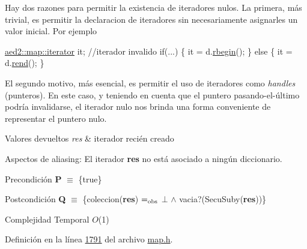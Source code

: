 Hay dos razones para permitir la existencia de iteradores nulos. La primera, más trivial, es permitir la declaracion de iteradores sin necesariamente asignarles un valor inicial. Por ejemplo 
\begin{DoxyCode}
\hyperlink{classaed2_1_1map_1_1iterator}{aed2::map::iterator} it;   \textcolor{comment}{//iterador invalido}
\textcolor{keywordflow}{if}(...) \{
  it = d.\hyperlink{classaed2_1_1map_ac412d3902112122c1bffe2d4283a4e9d_ac412d3902112122c1bffe2d4283a4e9d}{rbegin}();
\} \textcolor{keywordflow}{else} \{
  it = d.\hyperlink{classaed2_1_1map_a277f03b4f4b6b98879e4e4921081801f_a277f03b4f4b6b98879e4e4921081801f}{rend}();
\}
\end{DoxyCode}
 El segundo motivo, más esencial, es permitir el uso de iteradores como {\itshape handles} (punteros). En este caso, y teniendo en cuenta que el puntero pasando-\/el-\/último podría invalidarse, el iterador nulo nos brinda una forma conveniente de representar el puntero nulo.


\begin{DoxyRetVals}{Valores devueltos}
{\em res} & iterador recién creado\\
\hline
\end{DoxyRetVals}
\begin{DoxyParagraph}{Aspectos de aliasing\+:}
El iterador {\bfseries res} no está asociado a ningún diccionario.
\end{DoxyParagraph}
\begin{DoxyPrecond}{Precondición}
{\bfseries P} $\equiv$ \{true\} 
\end{DoxyPrecond}
\begin{DoxyPostcond}{Postcondición}
{\bfseries Q} $\equiv$ \{coleccion({\bfseries res}) $=_{\rm obs}$ $\bot$ $\land$ vacia?(Secu\+Suby({\bfseries res}))\}
\end{DoxyPostcond}

\begin{DoxyDescription}
\item[Complejidad Temporal]$O$(1)
\end{DoxyDescription}

Definición en la línea \hyperlink{map_8h_source_l01791}{1791} del archivo \hyperlink{map_8h_source}{map.\+h}.

